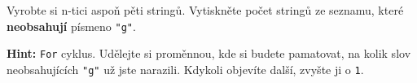 \question[50]
Vyrobte si n-tici aspoň pěti stringů. Vytiskněte počet stringů ze seznamu, které
\textbf{neobsahují} písmeno \texttt{"g"}.

\textbf{Hint:} \texttt{For} cyklus. Udělejte si proměnnou, kde si budete
pamatovat, na kolik slov neobsahujících \texttt{"g"} už jste narazili. Kdykoli
objevíte další, zvyšte ji o \texttt{1}.